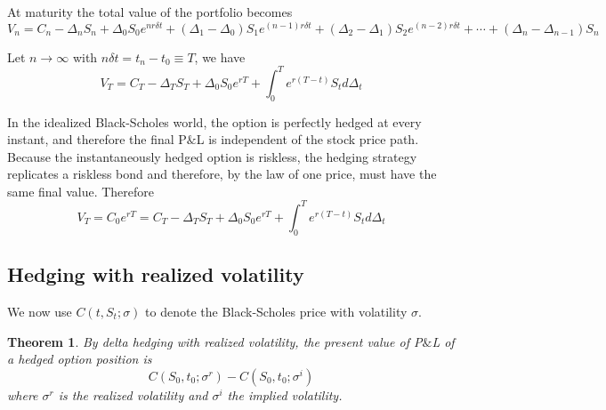 \documentclass[10pt]{article}
\theoremstyle{plain}
\newtheorem{theorem}{Theorem}[section]
\numberwithin{equation}{section}
\numberwithin{table}{section}
\newcommand{\s}{\sigma}
\newcommand{\de}{\delta}
\begin{document}
At maturity the total value of the portfolio becomes
\[
    V_n = C_n -\Delta_n S_n +\Delta_0 S_0 e^{nr\de t}+(\Delta_1-\Delta_0)S_1 e^{(n-1)r\de t}+(\Delta_2-\Delta_1)S_2 e^{(n-2)r\de t}+ \cdots + (\Delta_n-\Delta_{n-1})S_n
\]

Let $n \rightarrow \infty$ with $n \de t = t_n-t_0 \equiv T$, we have 
\[
    V_T = C_T -\Delta_TS_T +\Delta_0S_0 e^{rT} + \int_0^T  e^{r(T-t)}S_t d\Delta_t   
\]

In the idealized Black-Scholes world, the option is perfectly hedged at every instant,
and therefore the final P$\&$L is independent of the stock price path. Because
the instantaneously hedged option is riskless, the hedging strategy replicates
a riskless bond and therefore, by the law of one price, must have the same
final value. Therefore
\[
    V_T = C_0e^{rT} = C_T -\Delta_TS_T +\Delta_0S_0 e^{rT} + \int_0^T  e^{r(T-t)}S_t d\Delta_t        
\]


\subsection{Hedging with realized volatility}

We now use $C(t,S_t; \s)$ to denote the Black-Scholes price with volatility $\s$. 

\begin{theorem}
    By delta hedging with realized volatility, the present value of P$\&$L of a hedged option position is 
    \[
        C(S_0,t_0;\s^r)-C(S_0,t_0;\s^i)    
    \]
    where $\s^r$ is the realized volatility and $\s^i$ the implied volatility.

    \label{theorem_hedging_real_vol}
\end{theorem}
\end{document}
